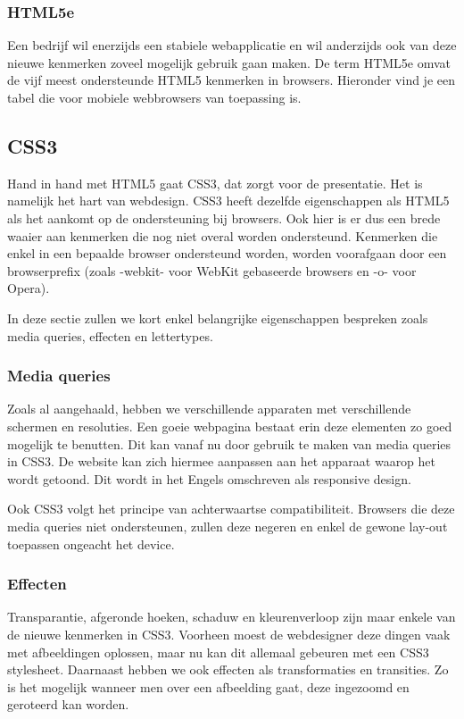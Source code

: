 \subsubsection{HTML5e}
Een bedrijf wil enerzijds een stabiele webapplicatie en wil anderzijds ook van deze nieuwe kenmerken zoveel mogelijk gebruik gaan maken. De term HTML5e omvat de vijf meest ondersteunde HTML5 kenmerken in browsers. Hieronder vind je een tabel die voor mobiele webbrowsers van toepassing is.

\subsection{CSS3}
Hand in hand met HTML5 gaat CSS3, dat zorgt voor de presentatie. Het is namelijk het hart van webdesign. CSS3 heeft dezelfde eigenschappen als HTML5 als het aankomt op de ondersteuning bij browsers. Ook hier is er dus een brede waaier aan kenmerken die nog niet overal worden ondersteund. Kenmerken die enkel in een bepaalde browser ondersteund worden, worden voorafgaan door een browserprefix (zoals -webkit- voor WebKit gebaseerde browsers en -o- voor Opera).

In deze sectie zullen we kort enkel belangrijke eigenschappen bespreken zoals media queries, effecten en lettertypes.

\subsubsection{Media queries}
Zoals al aangehaald, hebben we verschillende apparaten met verschillende schermen en resoluties. Een goeie webpagina bestaat erin deze elementen zo goed mogelijk te benutten. Dit kan vanaf nu door gebruik te maken van media queries in CSS3. De website kan zich hiermee aanpassen aan het apparaat waarop het wordt getoond. Dit wordt in het Engels omschreven als responsive design.

Ook CSS3 volgt het principe van achterwaartse compatibiliteit. Browsers die deze media queries niet ondersteunen, zullen deze negeren en enkel de gewone lay-out toepassen ongeacht het device.

\subsubsection{Effecten}
Transparantie, afgeronde hoeken, schaduw en kleurenverloop zijn maar enkele van de nieuwe kenmerken in CSS3. Voorheen moest de webdesigner deze dingen vaak met afbeeldingen oplossen, maar nu kan dit allemaal gebeuren met een CSS3 stylesheet. Daarnaast hebben we ook effecten als transformaties en transities. Zo is het mogelijk wanneer men over een afbeelding gaat, deze ingezoomd en geroteerd kan worden. 

